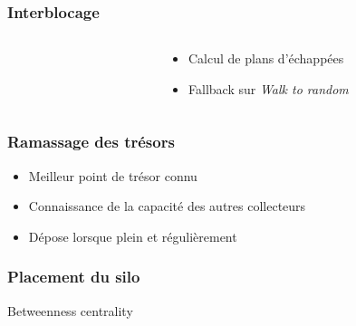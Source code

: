 \documentclass{beamer}
\newcommand{\vertex}{\node[vertex]}
\begin{document}
\begin{frame}
\frametitle{Interblocage}
\begin{columns}[T]
    \begin{column}{.48\textwidth}
    \center
    \end{column}~
    \begin{column}{.48\textwidth}
    \begin{itemize}
        \item Calcul de plans d'échappées
        \item Fallback sur \textit{Walk to random}
    \end{itemize}
    \end{column}
\end{columns}
\end{frame}

\begin{frame}
\frametitle{Ramassage des trésors}
\begin{itemize}
    \item Meilleur point de trésor connu
    \item Connaissance de la capacité des autres collecteurs
    \item Dépose lorsque plein et régulièrement
\end{itemize}
\end{frame}

\begin{frame}
\frametitle{Placement du silo}
Betweenness centrality
\end{frame}
\end{document}
